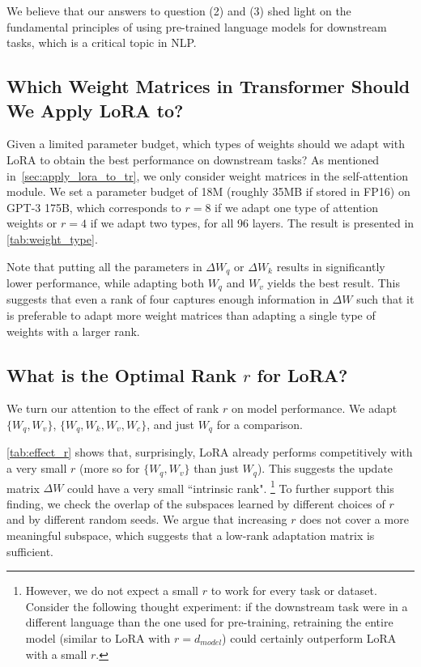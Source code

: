 We believe that our answers to question (2) and (3) shed light on the fundamental principles of using pre-trained language models for downstream tasks, which is a critical topic in NLP. 

\subsection{Which Weight Matrices in Transformer Should We Apply LoRA to?}
\label{sec:weight_types}
Given a limited parameter budget, which types of weights should we adapt with LoRA to obtain the best performance on downstream tasks? As mentioned in~\autoref{sec:apply_lora_to_tr}, we only consider weight matrices in the self-attention module. We set a parameter budget of 18M (roughly 35MB if stored in FP16) on GPT-3 175B, which corresponds to $r=8$ if we adapt one type of attention weights or $r=4$ if we adapt two types, for all 96 layers. The result is presented in \autoref{tab:weight_type}.

Note that putting all the parameters in $\Delta W_q$ or $\Delta W_k$ results in significantly lower performance, while adapting both $W_q$ and $W_v$ yields the best result. This suggests that even a rank of four captures enough information in $\Delta W$ such that it is preferable to adapt more weight matrices than adapting a single type of weights with a larger rank.

\subsection{What is the Optimal Rank $r$ for LoRA?}
\label{sec:effect_of_r}

We turn our attention to the effect of rank $r$ on model performance. We adapt $\{W_q, W_v\}$, $\{W_q, W_k, W_v, W_c\}$, and just $W_q$ for a comparison.

\autoref{tab:effect_r} shows that, surprisingly, LoRA already performs competitively with a very small $r$ (more so for $\{W_q, W_v\}$ than just $W_q$). This suggests the update matrix $\Delta W$ could have a very small ``intrinsic rank".
\footnote{However, we do not expect a small $r$ to work for every task or dataset. Consider the following thought experiment: if the downstream task were in a different language than the one used for pre-training, retraining the entire model (similar to LoRA with $r=d_{model}$) could certainly outperform LoRA with a small $r$.} To further support this finding, we check the overlap of the subspaces learned by different choices of $r$ and by different random seeds. We argue that increasing $r$ does not cover a more meaningful subspace, which suggests that a low-rank adaptation matrix is sufficient.

